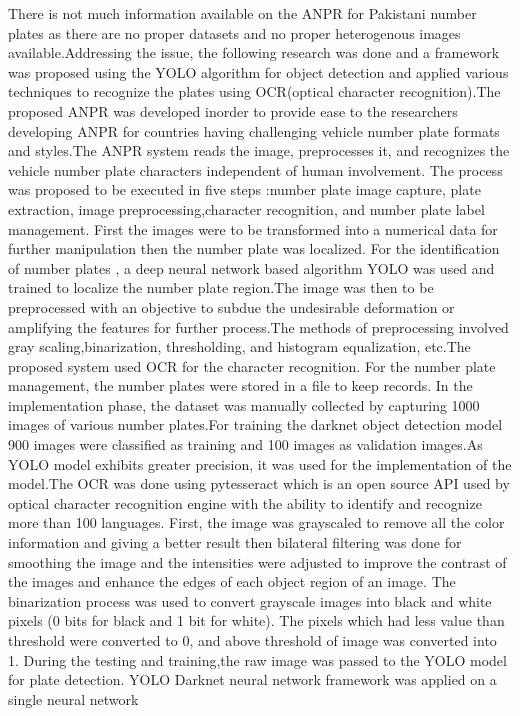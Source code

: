 \big[2\big]There is not much information available on the ANPR for Pakistani number plates as there are no proper datasets and no proper heterogenous images available.Addressing the issue, the following research was done and a framework was proposed using the YOLO algorithm for object detection and applied various techniques to recognize the plates using OCR(optical character recognition).The proposed \ac{ANPR} was developed inorder to provide ease to the researchers developing ANPR for countries having challenging vehicle number plate formats and styles.The ANPR system reads the image, preprocesses it, and recognizes the vehicle number plate characters independent of human involvement.  
The process was proposed to be executed in five steps :number plate image capture, plate extraction, image preprocessing,character recognition, and number plate label management.
First the images were to be transformed into a numerical data for further manipulation then the number plate was localized. For the identification of number plates , a deep neural network based algorithm YOLO was used and trained to localize the number plate region.The image was then to be preprocessed with an objective to subdue the undesirable deformation or amplifying the features for further process.The methods of preprocessing involved gray scaling,binarization, thresholding, and histogram equalization, etc.The proposed system used OCR for the character recognition. For the number plate management, the number plates were stored in a file to keep records. In the implementation phase, the dataset was manually collected by capturing 1000 images of various number plates.For training the darknet object detection model 900 images were classified as training and 100 images as validation images.As YOLO model exhibits greater precision, it was used for the implementation of the model.The OCR was done using pytesseract which is an open source \ac{API} used by optical character recognition engine with the ability to identify and recognize more than 100 languages.
First, the image was grayscaled to remove all the color information and giving a better result then bilateral filtering was done for smoothing the image and the intensities were adjusted to improve the contrast of the images and enhance the edges of each object region of an image. The binarization process was used to convert grayscale images into black and white pixels (0 bits for black and 1 bit for white). The pixels which had less value than threshold were converted to 0, and above threshold of image was converted into 1. During the testing and training,the raw image was passed to the YOLO model for plate detection. YOLO Darknet neural network framework was applied on a single neural network
